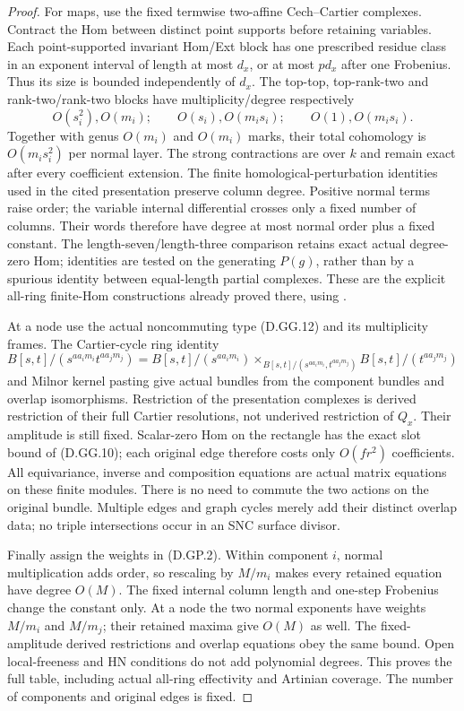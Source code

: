 \begin{proof}
For maps, use the fixed termwise two-affine
Cech--Cartier complexes. Contract the Hom between
distinct point supports before retaining variables.
Each point-supported invariant Hom/Ext block has
one prescribed residue class in an exponent
interval of length at most \(d_x\), or at most
\(pd_x\) after one Frobenius. Thus its size is
bounded independently of \(d_x\). The top-top,
top-rank-two and rank-two/rank-two blocks have
multiplicity/degree respectively
\[
 O(s_i^2),O(m_i);\qquad
 O(s_i),O(m_i s_i);\qquad
 O(1),O(m_i s_i).
 \]
Together with genus \(O(m_i)\) and \(O(m_i)\)
marks, their total cohomology is \(O(m_i s_i^2)\)
per normal layer. The strong contractions are
over \(k\) and remain exact after every coefficient
extension. The finite homological-perturbation
identities used in the cited presentation preserve
column degree. Positive normal terms raise order;
the variable internal differential crosses only
a fixed number of columns. Their words therefore
have degree at most normal order plus a fixed
constant. The length-seven/length-three comparison
retains exact actual degree-zero Hom; identities
are tested on the generating \(P(g)\), rather
than by a spurious identity between equal-length
partial complexes. These are the explicit
all-ring finite-Hom constructions already proved
there, using \citet[Sections2.1--2.4 and3.2]
{C_Crainic2004Perturbation}.

At a node use the actual noncommuting type
(D.GG.12) and its multiplicity frames. The
Cartier-cycle ring identity
\[
 B[s,t]/(s^{aa_i m_i}t^{aa_j m_j})
 =
 B[s,t]/(s^{aa_i m_i})
 \mathbin{\times}_{B[s,t]/(s^{aa_i m_i},t^{aa_j m_j})}
 B[s,t]/(t^{aa_j m_j})                                \tag{D.GP.8}
\]
and Milnor kernel pasting give actual bundles from
the component bundles and overlap isomorphisms.
Restriction of the presentation complexes is
derived restriction of their full Cartier
resolutions, not underived restriction of \(Q_x\).
Their amplitude is still fixed. Scalar-zero Hom
on the rectangle has the exact slot bound of
(D.GG.10); each original edge therefore costs
only \(O(fr^2)\) coefficients. All equivariance,
inverse and composition equations are actual
matrix equations on these finite modules.
There is no need to commute the two actions
on the original bundle. Multiple edges and
graph cycles merely add their distinct overlap
data; no triple intersections occur in an SNC
surface divisor.

Finally assign the weights in (D.GP.2).
Within component \(i\), normal multiplication
adds order, so rescaling by \(M/m_i\) makes every
retained equation have degree \(O(M)\).
The fixed internal column length and one-step
Frobenius change the constant only. At a node
the two normal exponents have weights \(M/m_i\)
and \(M/m_j\); their retained maxima give
\(O(M)\) as well. The fixed-amplitude derived
restrictions and overlap equations obey the
same bound. Open local-freeness and HN conditions
do not add polynomial degrees. This proves
the full table, including actual all-ring
effectivity and Artinian coverage. The number
of components and original edges is fixed.
\end{proof}

